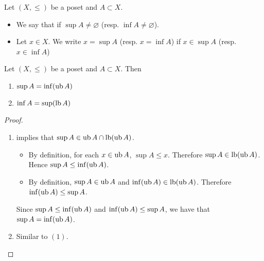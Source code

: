 \documentclass{book}
\begin{document}
	\begin{defn} 
		Let $(X, \leq)$ be a poset and $A \subset X$. 
		\begin{itemize}
			\item We say that  if $\sup A \neq \varnothing$ (resp. $\inf A \neq \varnothing$).
			\item Let $x \in X$. We write $x = \sup A$ (resp. $x = \inf A$) if $x \in \sup A$ (resp. $x \in \inf A$)
		\end{itemize}
	\end{defn}
	
	\begin{ex} 
		Let $(X, \leq)$ be a poset and $A \subset X$. Then 
		\begin{enumerate}
			\item $\sup A = \inf (\operatorname{ub} A)$ 
			\item $\inf A = \sup (\operatorname{lb} A)$
		\end{enumerate}
	\end{ex}
	
	\begin{proof}\
		\begin{enumerate}
			\item {} implies that $\sup A \in \operatorname{ub} A \cap \operatorname{lb} (\operatorname{ub} A)$.
			\begin{itemize}
				\item By definition, for each $x \in \operatorname{ub} A$, $\sup A \leq x$. Therefore $\sup A \in \operatorname{lb}(\operatorname{ub} A)$. Hence $\sup A \leq \inf (\operatorname{ub} A)$.
				\item By definition, $\sup A \in \operatorname{ub} A$ and $\inf (\operatorname{ub} A) \in \operatorname{lb} (\operatorname{ub} A)$. Therefore $\inf (\operatorname{ub} A) \leq \sup A$.
			\end{itemize}
			Since $\sup A \leq \inf (\operatorname{ub} A)$ and $\inf (\operatorname{ub} A) \leq \sup A$, we have that $\sup A = \inf (\operatorname{ub} A)$.
			\item Similar to $(1)$.
		\end{enumerate}
	\end{proof}
	
\end{document}
